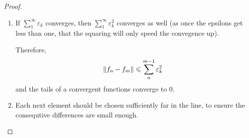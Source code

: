 \begin{proof}
    \begin{enumerate}
        \item {
            If $\sum_1^\infty \varepsilon_k$ converges, then
            $\sum_1^\infty \varepsilon_k^2$ converges as well
            (as once the epsilons get less than one, that the squaring will only
            speed the convegence up).

            Therefore,
            \[
                \lVert f_n - f_m\rVert \leqslant \sum_n^{m - 1} \varepsilon_k^2
            \]
            and the tails of a convergent functions converge to 0.
        }
        \item {
            Each next element should be chosen sufficiently far in the line, 
            to ensure the consequtive differences are small enough.
        }
    \end{enumerate}
\end{proof}

